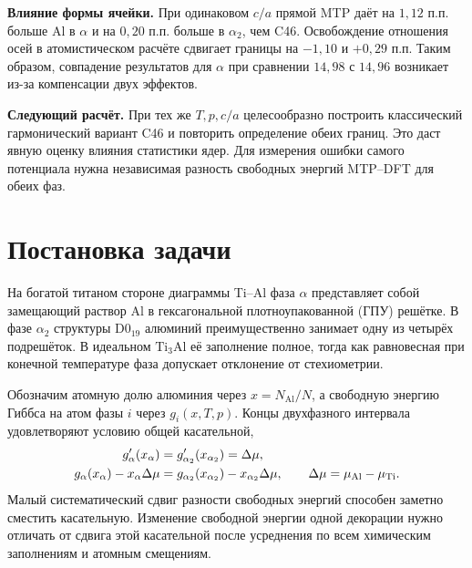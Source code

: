 \documentclass[11pt,a4paper]{article}
\begin{document}
\noindent\textbf{Влияние формы ячейки.}
При одинаковом \(c/a\) прямой MTP даёт на \(1{,}12\) п.п. больше Al
в \(\alpha\) и на \(0{,}20\) п.п. больше в \(\alpha_2\), чем C46.
Освобождение отношения осей в атомистическом расчёте сдвигает границы
на \(-1{,}10\) и \(+0{,}29\) п.п. Таким образом, совпадение результатов
для \(\alpha\) при сравнении \(14{,}98\) с \(14{,}96\) возникает из-за
компенсации двух эффектов.

\noindent\textbf{Следующий расчёт.}
При тех же \(T,p,c/a\) целесообразно построить классический гармонический
вариант C46 и повторить определение обеих границ. Это даст явную оценку
влияния статистики ядер. Для измерения ошибки самого потенциала
нужна независимая разность свободных энергий MTP--DFT для обеих фаз.

\vfill
{}
\clearpage
\section{Постановка задачи}
На богатой титаном стороне диаграммы Ti--Al фаза \(\alpha\) представляет
собой замещающий раствор Al в гексагональной плотноупакованной (ГПУ)
решётке. В фазе \(\alpha_2\) структуры D0$_{19}$ алюминий преимущественно
занимает одну из четырёх подрешёток. В идеальном \(\mathrm{Ti_3Al}\)
её заполнение полное, тогда как равновесная при конечной температуре
фаза допускает отклонение от стехиометрии.

Обозначим атомную долю алюминия через \(x=N_{\mathrm{Al}}/N\), а
свободную энергию Гиббса на атом фазы \(i\) через \(g_i(x,T,p)\).
Концы двухфазного интервала удовлетворяют условию общей касательной,
\begin{align}
  g'_\alpha(x_\alpha)&=g'_{\alpha_2}(x_{\alpha_2})=\Delta\mu, \\
  g_\alpha(x_\alpha)-x_\alpha\Delta\mu
    &=g_{\alpha_2}(x_{\alpha_2})-x_{\alpha_2}\Delta\mu ,
  \qquad \Delta\mu=\mu_{\rm Al}-\mu_{\rm Ti}.
\end{align}
Малый систематический сдвиг разности свободных энергий способен заметно
сместить касательную. Изменение свободной энергии одной декорации
нужно отличать от сдвига этой касательной после усреднения по всем
химическим заполнениям и атомным смещениям.
\end{document}
